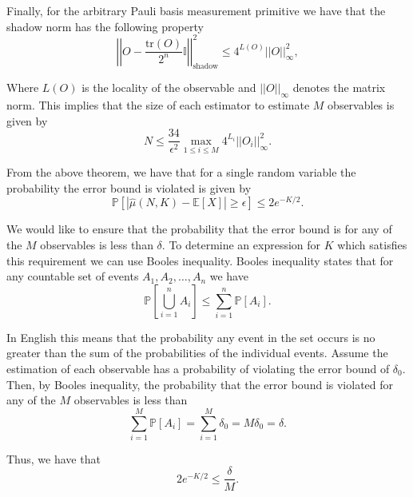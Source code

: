 \documentclass[12pt]{article}
\begin{document}
    Finally, for the arbitrary Pauli basis measurement primitive we have that the shadow norm has the following property
    \begin{equation}
        \left|\left| O - \frac{\text{tr}(O)}{2^n} \mathbb{I} \right|\right|^2_\text{shadow} \leq 4^{L(O)} ||O||^2_\infty,
    \end{equation}

    Where $L(O)$ is the locality of the observable and $||O||_\infty$ denotes the matrix norm. This implies that the size of each estimator to estimate $M$ observables is given by
    \begin{equation}
        N \leq \frac{34}{\epsilon^2} \max_{1\leq i \leq M} 4^{L_i} ||O_i||^2_\infty.
    \end{equation}

    From the above theorem, we have that for a single random variable the probability the error bound is violated is given by
    \begin{equation}
        \mathbb{P}[|\hat{\mu}(N, K) - \mathbb{E}[X]| \geq \epsilon] \leq 2e^{-K/2}.
    \end{equation}

    We would like to ensure that the probability that the error bound is for any of the $M$ observables is less than $\delta$. To determine an expression for $K$ which satisfies this requirement we can use Booles inequality. Booles inequality states that for any countable set of events $A_1, A_2, \ldots, A_n$ we have
    \begin{equation}
        \mathbb{P}\left[\bigcup_{i=1}^n A_i\right] \leq \sum_{i=1}^n \mathbb{P}[A_i].
    \end{equation}

    In English this means that the probability any event in the set occurs is no greater than the sum of the probabilities of the individual events. Assume the estimation of each observable has a probability of violating the error bound of $\delta_0$. Then, by Booles inequality, the probability that the error bound is violated for any of the $M$ observables is less than
    \begin{equation*}
        \sum_{i=1}^M \mathbb{P}[A_i] = \sum_{i=1}^M \delta_0 = M\delta_0 = \delta.
    \end{equation*}

    Thus, we have that
    \begin{equation*}
        2e^{-K/2} \leq \frac{\delta}{M}.
    \end{equation*}
\end{document}
